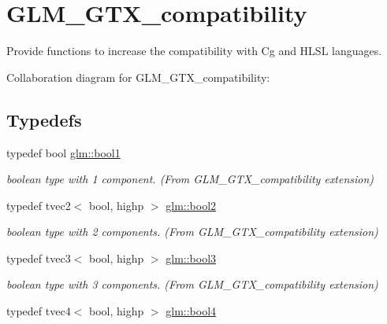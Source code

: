 \hypertarget{group__gtx__compatibility}{\section{G\-L\-M\-\_\-\-G\-T\-X\-\_\-compatibility}
\label{group__gtx__compatibility}
}


Provide functions to increase the compatibility with Cg and H\-L\-S\-L languages.  


Collaboration diagram for G\-L\-M\-\_\-\-G\-T\-X\-\_\-compatibility\-:
\subsection*{Typedefs}
\begin{DoxyCompactItemize}
\item 
\hypertarget{group__gtx__compatibility_gab65f19f5170f95a2f06d6aa6482c9405}{typedef bool \hyperlink{group__gtx__compatibility_gab65f19f5170f95a2f06d6aa6482c9405}{glm\-::bool1}}\label{group__gtx__compatibility_gab65f19f5170f95a2f06d6aa6482c9405}

\begin{DoxyCompactList}\small\item\em boolean type with 1 component. (From G\-L\-M\-\_\-\-G\-T\-X\-\_\-compatibility extension) \end{DoxyCompactList}\item 
\hypertarget{group__gtx__compatibility_gabe088d78d539d2a98a2a04ab798fec1a}{typedef tvec2$<$ bool, highp $>$ \hyperlink{group__gtx__compatibility_gabe088d78d539d2a98a2a04ab798fec1a}{glm\-::bool2}}\label{group__gtx__compatibility_gabe088d78d539d2a98a2a04ab798fec1a}

\begin{DoxyCompactList}\small\item\em boolean type with 2 components. (From G\-L\-M\-\_\-\-G\-T\-X\-\_\-compatibility extension) \end{DoxyCompactList}\item 
\hypertarget{group__gtx__compatibility_gab7658aa2e0688b8ac7e640cf7e405c1e}{typedef tvec3$<$ bool, highp $>$ \hyperlink{group__gtx__compatibility_gab7658aa2e0688b8ac7e640cf7e405c1e}{glm\-::bool3}}\label{group__gtx__compatibility_gab7658aa2e0688b8ac7e640cf7e405c1e}

\begin{DoxyCompactList}\small\item\em boolean type with 3 components. (From G\-L\-M\-\_\-\-G\-T\-X\-\_\-compatibility extension) \end{DoxyCompactList}\item 
\hypertarget{group__gtx__compatibility_ga141861edebf999f94938944f0fb0777a}{typedef tvec4$<$ bool, highp $>$ \hyperlink{group__gtx__compatibility_ga141861edebf999f94938944f0fb0777a}{glm\-::bool4}}\label{group__gtx__compatibility_ga141861edebf999f94938944f0fb0777a}


\end{DoxyCompactItemize}
